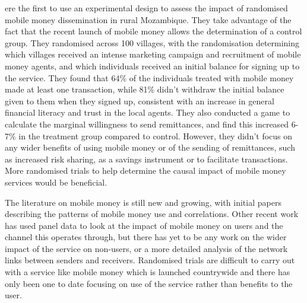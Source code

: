 \cite{Batista2013} ere the first to use an experimental design to assess the impact of randomised mobile money dissemination in rural Mozambique. They take advantage of the fact that the recent launch of mobile money allows the determination of a  control group. They randomised across 100 villages, with the randomisation determining which villages received an intense marketing campaign and recruitment of mobile money agents, and which individuals received an initial balance for signing up to the service. They found that 64\% of the individuals treated with mobile money made at least one transaction, while 81\% didn't withdraw the initial balance given to them when they signed up, consistent with an increase in general financial literacy and trust in the local agents. They also conducted a game to calculate the marginal willingness to send remittances, and find this increased 6-7\% in the treatment group compared to control. However, they didn't focus on any wider benefits of using mobile money or of the sending of remittances, such as increased risk sharing, as a savings instrument or to facilitate transactions. More randomised trials to help  determine the causal impact of mobile money services would be beneficial.  

The literature on mobile money is still new and growing, with initial papers describing the patterns of mobile money use and correlations. Other recent work has used panel data to look at the impact of mobile money on users and the channel this operates through, but there has yet to be any work on the wider impact of the service on non-users, or a more detailed analysis of the network links between senders and receivers. Randomised trials are difficult to carry out with a service like mobile money which is launched countrywide and there has only been one to date focusing on use of the service rather than benefits to the user. 

